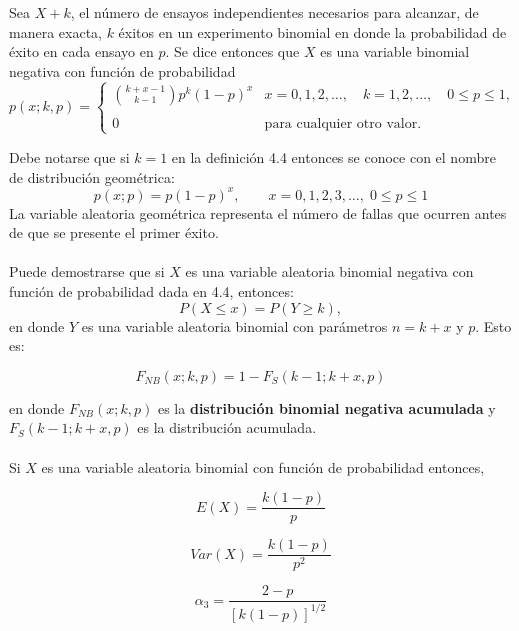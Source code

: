 \begin{tcolorbox}
    \begin{def.}
	Sea $X+k$, el número de ensayos independientes necesarios para alcanzar, de manera exacta, $k$ éxitos en un experimento binomial en donde la probabilidad de éxito en cada ensayo en $p$. Se dice entonces que $X$ es una variable binomial negativa con función de probabilidad
	$$p(x;k,p)=\left\{\begin{array}{ll}
	    {k+x-1\choose k-1}p^k(1-p)^x & x=0,1,2,\ldots,\quad k=1,2,\ldots, \quad 0\leq p \leq 1,\\\\
	    0 & \mbox{para cualquier otro valor.}

	\end{array}\right.$$
    \end{def.}
\end{tcolorbox}

Debe notarse que si $k=1$ en la definición 4.4 entonces se conoce con el nombre de distribución geométrica:
$$p(x;p)=p(1-p)^x, \qquad x=0,1,2,3,\ldots,\; 0\leq p\leq 1$$
La variable aleatoria geométrica representa el número de fallas que ocurren antes de que se presente el primer éxito.\\\\
Puede demostrarse que si $X$ es una variable aleatoria binomial negativa con función de probabilidad dada en 4.4, entonces:
$$P(X\leq x ) = P(Y\geq k),$$
en donde $Y$ es una variable aleatoria binomial con parámetros $n=k+x$ y $p$. Esto es:
\begin{tcolorbox}
$$F_{NB}(x;k,p)=1-F_S(k-1;k+x,p)$$
\end{tcolorbox}
en donde $F_{NB}(x;k,p)$ es la \textbf{distribución binomial negativa acumulada} y $F_S(k-1;k+x,p)$ es la distribución acumulada.\\\\
Si $X$ es una variable aleatoria binomial con función de probabilidad entonces,

\begin{tcolorbox}
    $$E(X)=\dfrac{k(1-p)}{p}$$
\end{tcolorbox}

\begin{tcolorbox}
    $$Var(X)=\dfrac{k(1-p)}{p^2}$$
\end{tcolorbox}

\begin{tcolorbox}
    $$\alpha_3=\dfrac{2-p}{[k(1-p)]^{1/2}}$$
\end{tcolorbox}


